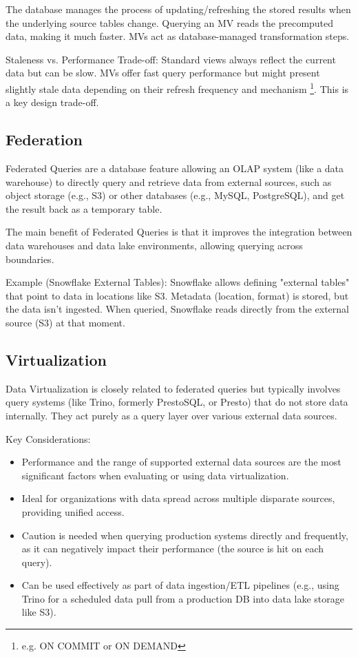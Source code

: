 The database manages the process of updating/refreshing
the stored results when the underlying source tables
change. Querying an MV reads the precomputed data,
making it much faster. MVs act as database-managed
transformation steps.

Staleness vs. Performance Trade-off: Standard views
always reflect the current data but can be slow.
MVs offer fast query performance but might present
slightly stale data depending on their refresh
frequency and mechanism
\footnote{
    e.g.  ON COMMIT or ON DEMAND
}.
This is a key design trade-off.


\subsection*{Federation}
Federated Queries are a database feature allowing an
OLAP system (like a data warehouse) to directly query
and retrieve data from external sources, such as
object storage (e.g., S3) or other databases
(e.g., MySQL, PostgreSQL), 
and get the result back as a temporary table.

The main benefit of Federated Queries is that
it improves the integration between data
warehouses and data lake environments,
allowing querying across boundaries.

Example (Snowflake External Tables): Snowflake
allows defining "external tables" that point
to data in locations like S3. Metadata
(location, format) is stored, but the data
isn't ingested. When queried, Snowflake
reads directly from the external source
(S3) at that moment.


\subsection*{Virtualization}
Data Virtualization is closely related
to federated queries but typically involves query
systems (like Trino, formerly PrestoSQL, or Presto)
that do not store data internally. They act purely
as a query layer over various external data sources.

Key Considerations:
\begin{itemize}
    \item Performance and the range of supported
    external data sources are the most significant
    factors when evaluating or using data
    virtualization.

    \item Ideal for organizations with data spread
    across multiple disparate sources, providing
    unified access.

    \item Caution is needed when querying production
    systems directly and frequently, as it can
    negatively impact their performance
    (the source is hit on each query).

    \item Can be used effectively as part of data
    ingestion/ETL pipelines (e.g., using Trino for
    a scheduled data pull from a production DB into
    data lake storage like S3).
\end{itemize}

